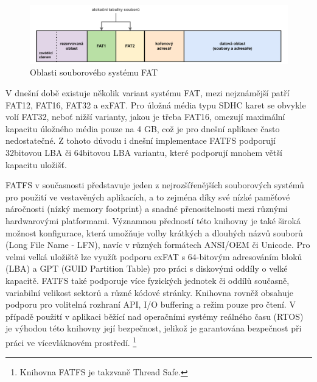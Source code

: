 \begin{figure}[h]
    \centering
    \includegraphics[width=1.00\textwidth]{obrazky-figures/fatfs_structure-cz.pdf}
    
    \caption{Oblasti souborového systému FAT \cite{recoverit_fat_filesystem}}
    \label{fig:fatfs-structure}
\end{figure}

V dnešní době existuje několik variant systému FAT, mezi nejznámější patří FAT12, FAT16, FAT32 a exFAT. Pro úložná média typu SDHC karet se obvykle volí FAT32, neboť nižší varianty, jakou je třeba FAT16, omezují maximální kapacitu úložného média pouze na 4 GB, což je pro dnešní aplikace často nedostatečné. Z tohoto důvodu i dnešní implementace FATFS podporují 32bitovou LBA či 64bitovou LBA variantu, které podporují mnohem větší kapacitu uložišť. \cite{elm_fat_filesystem_app_note}

FATFS v současnosti představuje jeden z nejrozšířenějších souborových systémů pro použití ve vestavěných aplikacích, a to zejména díky své nízké paměťové náročnosti (nízký memory footprint) a snadné přenositelnosti mezi různými hardwarovými platformami. Významnou předností této knihovny je také široká možnost konfigurace, která umožňuje volby krátkých a dlouhých názvů souborů (Long File Name - LFN), navíc v různých formátech ANSI/OEM či Unicode. Pro velmi velká uložiště lze využít podporu exFAT s 64-bitovým adresováním bloků (LBA) a GPT (GUID Partition Table) pro práci s diskovými oddíly o velké kapacitě. FATFS také podporuje více fyzických jednotek či oddílů současně, variabilní velikost sektorů a různé kódové stránky. Knihovna rovněž obsahuje podporu pro volitelná rozhraní API, I/O buffering a režim pouze pro čtení. V případě použití v aplikaci běžící nad operačními systémy reálného času (RTOS) je výhodou této knihovny její bezpečnost, jelikož je garantována bezpečnost při práci ve vícevláknovém prostředí. \footnote{Knihovna FATFS je takzvaně Thread Safe.} \cite{elm_fat_filesystem_module}


